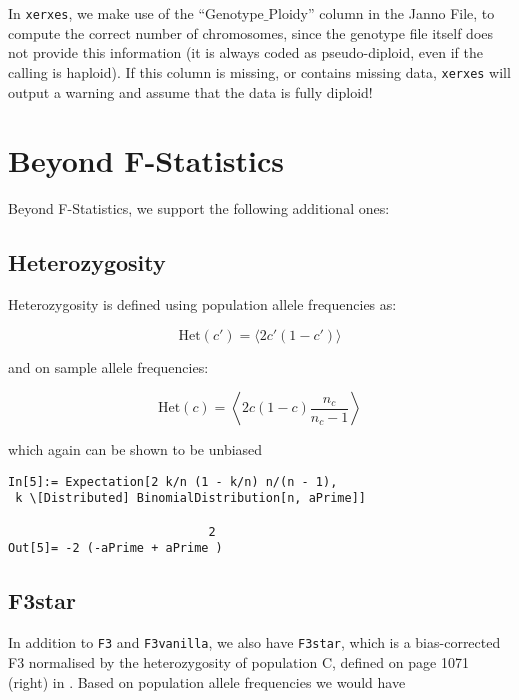 \documentclass{article}
\begin{document}
In \texttt{xerxes}, we make use of the {``}Genotype$\_$Ploidy{''} column in the Janno File, to compute the correct number of chromosomes, since the genotype file itself does not provide this information (it is always coded as pseudo-diploid, even if the calling is haploid). If this column is missing, or contains missing data, \texttt{xerxes} will output a warning and assume that the data is fully diploid!

\section{Beyond F-Statistics}

Beyond F-Statistics, we support the following additional ones:

\subsection{Heterozygosity}

Heterozygosity is defined using population allele frequencies as:

\begin{equation}
\text{Het}(c')=\langle 2c'(1-c')\rangle
\end{equation}

and on sample allele frequencies:

\begin{equation}
\text{Het}(c)=\left\langle 2 c(1-c )\frac{n_c}{n_c-1}\right\rangle
\end{equation}

which again can be shown to be unbiased

\begin{lstlisting}
In[5]:= Expectation[2 k/n (1 - k/n) n/(n - 1),                                  
 k \[Distributed] BinomialDistribution[n, aPrime]]                              

                            2
Out[5]= -2 (-aPrime + aPrime )
\end{lstlisting}

\subsection{F3star}

In addition to \texttt{F3} and \texttt{F3vanilla}, we also have \texttt{F3star}, which is a bias-corrected F3 normalised by the heterozygosity of population C, defined on page 1071 (right) in \cite{Patterson2012-yq}. Based on population allele frequencies we would have
\end{document}
